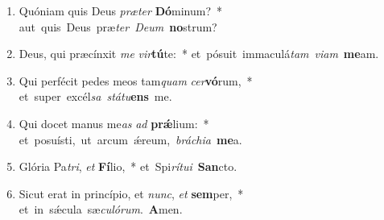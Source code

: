 \begin{flushleft}
\begin{enumerate}[leftmargin=*]
\item Quóniam quis Deus {\it præ}{\it ter} \textbf{Dó}minum?~* \mbox{aut quis Deus præ{\it ter} {\it De}{\it um} \textbf{no}strum?}
\item Deus, qui præcínxit {\it me} {\it vir}\textbf{tú}te:~* \mbox{et pósuit immaculá{\it tam} {\it vi}{\it am} \textbf{me}am.}
\item Qui perfécit pedes meos tam{\it quam} {\it cer}\textbf{vó}rum,~* \mbox{et super excél{\it sa} {\it stá}{\it tu}\textbf{ens} me.}
\item Qui docet manus me{\it as} {\it ad} \textbf{pr\'{\ae}}lium:~* \mbox{et posuísti, ut arcum \'{\ae}reum, {\it brá}{\it chi}{\it a} \textbf{me}a.}
\item Glória Pa{\it tri}, {\it et} \textbf{Fí}lio,~* \mbox{et Spi{\it rí}{\it tu}{\it i} \textbf{San}cto.}
\item Sicut erat in princípio, et {\it nunc}, {\it et} \textbf{sem}per,~* \mbox{et in s\'{\ae}cula sæ{\it cu}{\it ló}{\it rum}. \textbf{A}men.}

\end{enumerate}
\end{flushleft}

